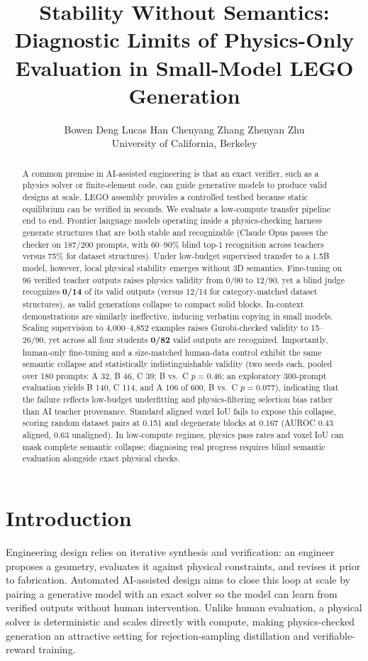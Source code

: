 \documentclass{article}
\title{Stability Without Semantics: Diagnostic Limits of Physics-Only Evaluation in Small-Model LEGO Generation}
\author{Bowen Deng \qquad Lucas Han \qquad Chenyang Zhang \qquad Zhenyan Zhu \\ University of California, Berkeley}
\begin{document}
\maketitle

\begin{abstract}
A common premise in AI-assisted engineering is that an exact verifier, such as a physics solver or finite-element code, can guide generative models to produce valid designs at scale. LEGO assembly provides a controlled testbed because static equilibrium can be verified in seconds. We evaluate a low-compute transfer pipeline end to end. Frontier language models operating inside a physics-checking harness generate structures that are both stable and recognizable (Claude Opus passes the checker on 187/200 prompts, with 60--90\% blind top-1 recognition across teachers versus 75\% for dataset structures). Under low-budget supervised transfer to a 1.5B model, however, local physical stability emerges without 3D semantics. Fine-tuning on 96 verified teacher outputs raises physics validity from 0/90 to 12/90, yet a blind judge recognizes \textbf{0/14} of its valid outputs (versus 12/14 for category-matched dataset structures), as valid generations collapse to compact solid blocks. In-context demonstrations are similarly ineffective, inducing verbatim copying in small models. Scaling supervision to 4{,}000--4{,}852 examples raises Gurobi-checked validity to 15--26/90, yet across all four students \textbf{0/82} valid outputs are recognized. Importantly, human-only fine-tuning and a size-matched human-data control exhibit the same semantic collapse and statistically indistinguishable validity (two seeds each, pooled over 180 prompts: A 32, B 46, C 39; B vs.\ C $p=0.46$; an exploratory 300-prompt evaluation yields B 140, C 114, and A 106 of 600, B vs.\ C $p=0.077$), indicating that the failure reflects low-budget underfitting and physics-filtering selection bias rather than AI teacher provenance. Standard aligned voxel IoU fails to expose this collapse, scoring random dataset pairs at 0.151 and degenerate blocks at 0.167 (AUROC 0.43 aligned, 0.63 unaligned). In low-compute regimes, physics pass rates and voxel IoU can mask complete semantic collapse; diagnosing real progress requires blind semantic evaluation alongside exact physical checks.
\end{abstract}

\section{Introduction}
\label{sec:intro}
Engineering design relies on iterative synthesis and verification: an engineer proposes a geometry, evaluates it against physical constraints, and revises it prior to fabrication. Automated AI-assisted design aims to close this loop at scale by pairing a generative model with an exact solver so the model can learn from verified outputs without human intervention. Unlike human evaluation, a physical solver is deterministic and scales directly with compute, making physics-checked generation an attractive setting for rejection-sampling distillation and verifiable-reward training.
\end{document}
